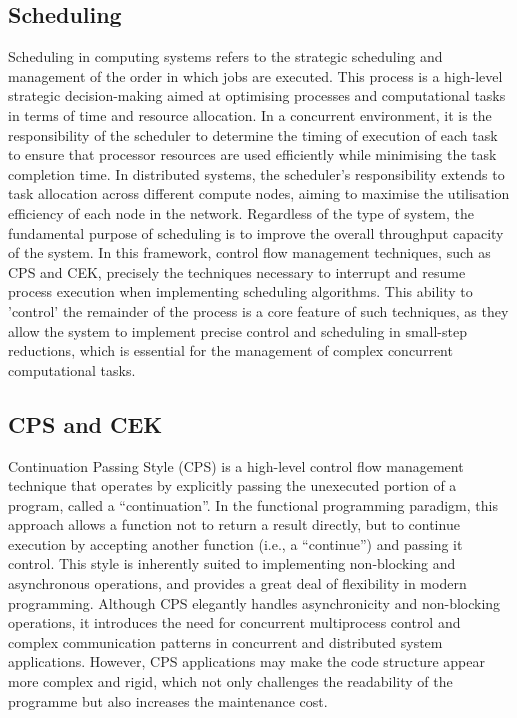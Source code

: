 \documentclass{l4proj}
\begin{document}
\subsection{Scheduling}
Scheduling in computing systems refers to the strategic scheduling and management of the order in which jobs are executed. This process is a high-level strategic decision-making aimed at optimising processes and computational tasks in terms of time and resource allocation. In a concurrent environment, it is the responsibility of the scheduler to determine the timing of execution of each task to ensure that processor resources are used efficiently while minimising the task completion time. In distributed systems, the scheduler's responsibility extends to task allocation across different compute nodes, aiming to maximise the utilisation efficiency of each node in the network. Regardless of the type of system, the fundamental purpose of scheduling is to improve the overall throughput capacity of the system. In this framework, control flow management techniques, such as CPS and CEK, precisely the techniques necessary to interrupt and resume process execution when implementing scheduling algorithms. This ability to 'control' the remainder of the process is a core feature of such techniques, as they allow the system to implement precise control and scheduling in small-step reductions, which is essential for the management of complex concurrent computational tasks.

\subsection{CPS and CEK}
Continuation Passing Style (CPS) is a high-level control flow management technique that operates by explicitly passing the unexecuted portion of a program, called a “continuation”. In the functional programming paradigm, this approach allows a function not to return a result directly, but to continue execution by accepting another function (i.e., a “continue”) and passing it control. This style is inherently suited to implementing non-blocking and asynchronous operations, and provides a great deal of flexibility in modern programming. Although CPS elegantly handles asynchronicity and non-blocking operations, it introduces the need for concurrent multiprocess control and complex communication patterns in concurrent and distributed system applications. However, CPS applications may make the code structure appear more complex and rigid, which not only challenges the readability of the programme but also increases the maintenance cost.
\end{document}
